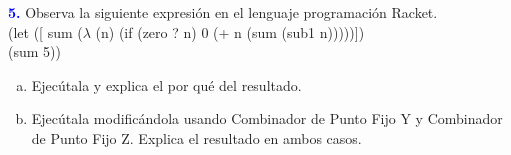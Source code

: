 \textbf{\textcolor{blue}{5.}} \Large
Observa la siguiente expresión en el lenguaje programación Racket.\\

(let ([ sum ($\lambda$ (n) (if (zero ? n) 0 (+ n (sum (sub1 n)))))])\\
(sum 5))

\begin{enumerate}[a)]
    \item Ejecútala y explica el por qué del resultado.
    \item Ejecútala modificándola usando Combinador de Punto Fijo Y y
    Combinador de Punto Fijo Z. Explica el resultado en ambos casos.
\end{enumerate}
